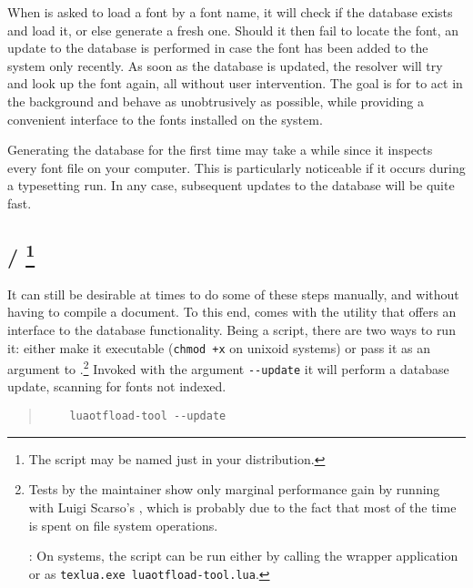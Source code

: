 When  is asked to load a font by a font name,
it will check if the database exists and load it, or else generate a
fresh one.
%
Should it then fail to locate the font, an update to the database is
performed in case the font has been added to the system only
recently.
%
As soon as the database is updated, the resolver will try
and look up the font again, all without user intervention.
%
The goal is for  to act in the background and
behave as unobtrusively as possible, while providing a convenient
interface to the fonts installed on the system.

Generating the database for the first time may take a while since it
inspects every font file on your computer.
%
This is particularly noticeable if it occurs during a typesetting run.
In any case, subsequent updates to the database will be quite fast.

\subsection[luaotfload-tool / mkluatexfontdb.lua]%
           { /
            \footnote{%
  The script may be named just  in your
  distribution.
}}

It can still be desirable at times to do some of these steps
manually, and without having to compile a document.
%
To this end,  comes with the utility
 that offers an interface to the database
functionality.
%
Being a \LUA script, there are two ways to run it:
either make it executable (\verb|chmod +x| on unixoid systems) or
pass it as an argument to .\footnote{%
  Tests by the maintainer show only marginal performance gain by
  running with Luigi Scarso’s
  \href{https://foundry.supelec.fr/projects/luajittex/}%
       {},
  which is probably due to the fact that most of the time is spent
  on file system operations.

  :
  On   systems, the script can be run
  either by calling the wrapper application
   or as
  \verb|texlua.exe luaotfload-tool.lua|.
}
%
Invoked with the argument \verb|--update| it will perform a database
update, scanning for fonts not indexed.

\begin{quote}
  \begin{verbatim}
    luaotfload-tool --update
  \end{verbatim}
\end{quote}

